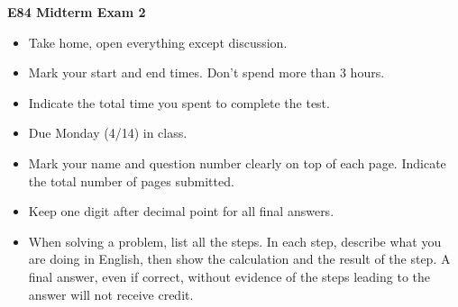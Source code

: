 \usepackage{html}

\begin{center}
{\Large \bf E84 Midterm Exam 2}
\end{center}

\begin{itemize}
\item Take home, open everything except discussion.
\item Mark your start and end times. Don't spend more than 3 hours.
\item Indicate the total time you spent to complete the test.
\item Due Monday (4/14) in class.
\item Mark your name and question number clearly on top of each page.
	Indicate the total number of pages submitted.
\item Keep one digit after decimal point for all final answers. 
\item When solving a problem, list all the steps. In each step, describe 
	what you are doing in English, then show the calculation and the 
	result of the step. A final answer, even if correct, without 
	evidence of the steps leading to the answer will not receive credit.
\end{itemize}

